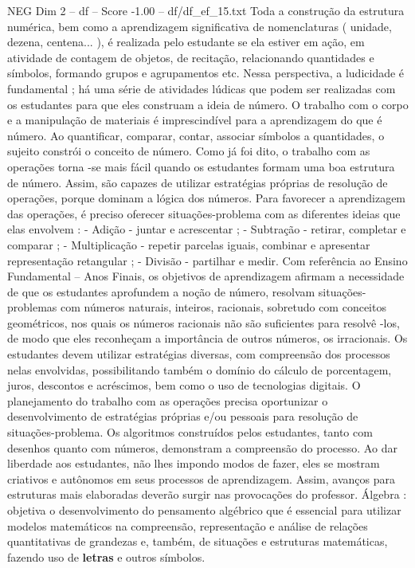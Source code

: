 \begin{textsample}{NEG Dim 2 – df – Score -1.00 – df/df\_ef\_15.txt}
Toda a construção da estrutura numérica, bem como a aprendizagem significativa de nomenclaturas ( unidade, dezena, centena... ), é realizada pelo estudante se ela estiver em ação, em atividade de contagem de objetos, de recitação, relacionando quantidades e símbolos, formando grupos e agrupamentos etc.
Nessa perspectiva, a ludicidade é fundamental ; há uma série de atividades lúdicas que podem ser realizadas com os estudantes para que eles construam a ideia de número.
O trabalho com o corpo e a manipulação de materiais é imprescindível para a aprendizagem do que é número.
Ao quantificar, comparar, contar, associar símbolos a quantidades, o sujeito constrói o conceito de número.
Como já foi dito, o trabalho com as operações torna -se mais fácil quando os estudantes formam uma boa estrutura de número.
Assim, são capazes de utilizar estratégias próprias de resolução de operações, porque dominam a lógica dos números.
Para favorecer a aprendizagem das operações, é preciso oferecer situações-problema com as diferentes ideias que elas envolvem : - Adição - juntar e acrescentar ; - Subtração - retirar, completar e comparar ; - Multiplicação - repetir parcelas iguais, combinar e apresentar representação retangular ; - Divisão - partilhar e medir.
Com referência ao Ensino Fundamental – Anos Finais, os objetivos de aprendizagem afirmam a necessidade de que os estudantes aprofundem a noção de número, resolvam situações-problemas com números naturais, inteiros, racionais, sobretudo com conceitos geométricos, nos quais os números racionais não são suficientes para resolvê -los, de modo que eles reconheçam a importância de outros números, os irracionais.
Os estudantes devem utilizar estratégias diversas, com compreensão dos processos nelas envolvidas, possibilitando também o domínio do cálculo de porcentagem, juros, descontos e acréscimos, bem como o uso de tecnologias digitais.
O planejamento do trabalho com as operações precisa oportunizar o desenvolvimento de estratégias próprias e/ou pessoais para resolução de situações-problema.
Os algoritmos construídos pelos estudantes, tanto com desenhos quanto com números, demonstram a compreensão do processo.
Ao dar liberdade aos estudantes, não lhes impondo modos de fazer, eles se mostram criativos e autônomos em seus processos de aprendizagem.
Assim, avanços para estruturas mais elaboradas deverão surgir nas provocações do professor.
Álgebra : objetiva o desenvolvimento do pensamento algébrico que é essencial para utilizar modelos matemáticos na compreensão, representação e análise de relações quantitativas de grandezas e, também, de situações e estruturas matemáticas, fazendo uso de \textbf{letras} e outros símbolos.

\end{textsample}
